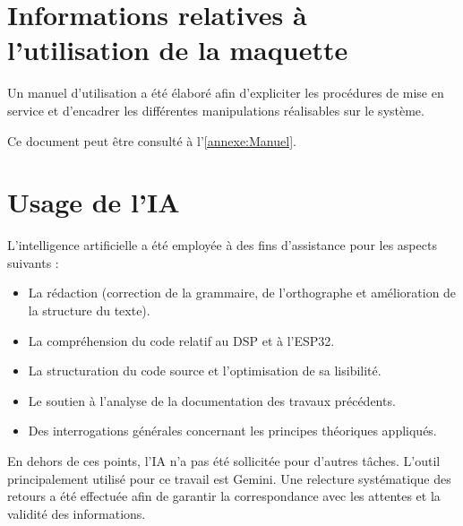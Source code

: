 \section{Informations relatives à l'utilisation de la maquette}
\label{sec:usage_maquette}
Un manuel d'utilisation a été élaboré afin d'expliciter les procédures de mise en service et d'encadrer les différentes manipulations réalisables sur le système.

Ce document peut être consulté à l'\autoref{annexe:Manuel}.

\section{Usage de l'IA}
L'intelligence artificielle a été employée à des fins d'assistance pour les aspects suivants :
\begin{itemize}
    \item La rédaction (correction de la grammaire, de l'orthographe et amélioration de la structure du texte).
    \item La compréhension du code relatif au DSP et à l'ESP32.
    \item La structuration du code source et l'optimisation de sa lisibilité.
    \item Le soutien à l'analyse de la documentation des travaux précédents.
    \item Des interrogations générales concernant les principes théoriques appliqués.
\end{itemize}

En dehors de ces points, l'IA n'a pas été sollicitée pour d'autres tâches. L'outil principalement utilisé pour ce travail est Gemini. Une relecture systématique des retours a été effectuée afin de garantir la correspondance avec les attentes et la validité des informations.